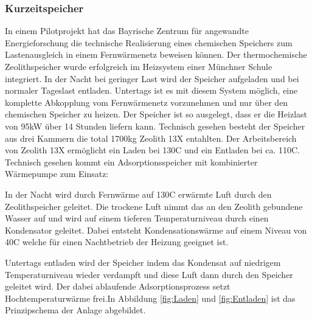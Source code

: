 \documentclass[11pt,a4paper]{scrartcl}
\begin{document}
\subsubsection{Kurzeitspeicher}

In einem Pilotprojekt hat das Bayrische Zentrum für angewandte Energieforschung
die technische Realisierung eines chemischen Speichers zum Lastenausgleich in
einem Fernwärmenetz beweisen können. Der thermochemische Zeolithspeicher wurde
erfolgreich im Heizsystem einer Münchner Schule integriert. In der Nacht bei
geringer Last wird der Speicher aufgeladen und bei normaler Tageslast entladen.
Untertags ist es mit diesem System möglich, eine komplette Abkopplung vom
Fernwärmenetz vorzunehmen und nur über den chemischen Speicher zu heizen. Der
Speicher ist so ausgelegt, dass er die Heizlast von 95kW über 14 Stunden liefern
kann. Technisch gesehen besteht der Speicher aus drei Kammern die total 1700kg
Zeolith 13X entahlten. Der Arbeitsbereich von Zeolith 13X ermöglicht ein Laden
bei 130\textdegree C und ein Entladen bei ca. 110\textdegree C. Technisch
gesehen kommt ein Adsorptionsspeicher mit kombinierter Wärmepumpe zum Einsatz:

In der Nacht wird durch Fernwärme auf 130\textdegree C erwärmte Luft durch den
Zeolithspeicher geleitet. Die trockene Luft nimmt das an den Zeolith gebundene
Wasser auf und wird auf einem tieferen Temperaturniveau durch einen Kondensator
geleitet. Dabei entsteht Kondensationswärme auf einem Niveau von 40\textdegree C
welche für einen Nachtbetrieb der Heizung geeignet ist. 

Untertags entladen wird der Speicher indem das Kondensat auf niedrigem
Temperaturniveau wieder verdampft und diese Luft dann durch den Speicher
geleitet wird. Der dabei ablaufende Adsorptionsprozess setzt Hochtemperaturwärme
frei.In Abbildung \ref{fig:Laden} und \ref{fig:Entladen} ist das Prinzipschema
der Anlage abgebildet.
\end{document}
